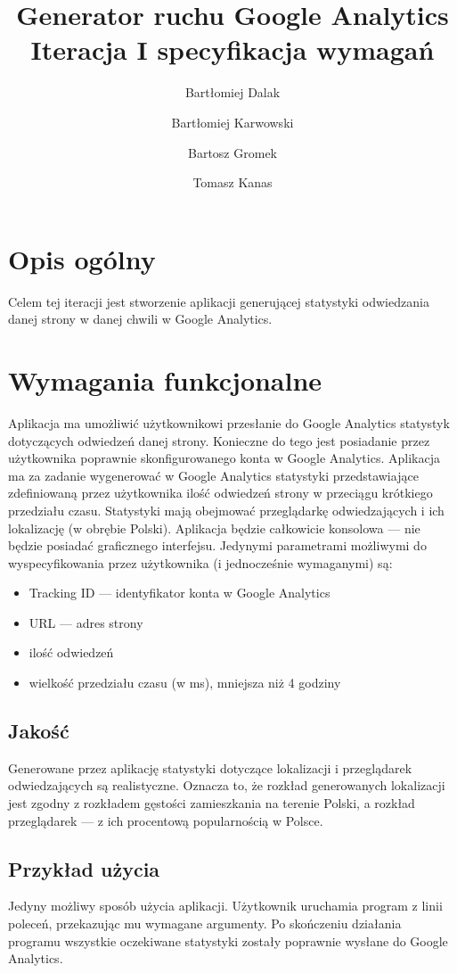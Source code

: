 \documentclass{article}
\title{Generator ruchu Google Analytics \\ Iteracja I specyfikacja wymagań}
\author{Bartłomiej Dalak \and Bartłomiej Karwowski \and Bartosz Gromek \and Tomasz Kanas}
\begin{document}
\maketitle

\section{Opis ogólny}

Celem tej iteracji jest stworzenie aplikacji generującej statystyki odwiedzania danej strony w danej chwili w Google Analytics.

\section{Wymagania funkcjonalne}

Aplikacja ma umożliwić użytkownikowi przesłanie do Google Analytics statystyk dotyczących odwiedzeń danej strony. Konieczne do tego jest posiadanie przez użytkownika poprawnie skonfigurowanego konta w Google Analytics. Aplikacja ma za zadanie wygenerować w Google Analytics statystyki przedstawiające zdefiniowaną przez użytkownika ilość odwiedzeń strony w przeciągu krótkiego przedziału czasu. Statystyki mają obejmować przeglądarkę odwiedzających i ich lokalizację (w obrębie Polski). Aplikacja będzie całkowicie konsolowa --- nie będzie posiadać graficznego interfejsu. Jedynymi parametrami możliwymi do wyspecyfikowania przez użytkownika (i jednocześnie wymaganymi) są:
\begin{itemize}
\item Tracking ID --- identyfikator konta w Google Analytics
\item URL --- adres strony
\item ilość odwiedzeń
\item wielkość przedziału czasu (w ms), mniejsza niż 4 godziny
\end{itemize}

\subsection{Jakość}
Generowane przez aplikację statystyki dotyczące lokalizacji i przeglądarek odwiedzających są realistyczne. Oznacza to, że rozkład generowanych lokalizacji jest zgodny z rozkładem gęstości zamieszkania na terenie Polski, a rozkład przeglądarek --- z ich procentową popularnością w Polsce.

\subsection{Przykład użycia}
Jedyny możliwy sposób użycia aplikacji. Użytkownik uruchamia program z linii poleceń, przekazując mu wymagane argumenty. Po skończeniu działania programu wszystkie oczekiwane statystyki zostały poprawnie wysłane do Google Analytics.
\end{document}
